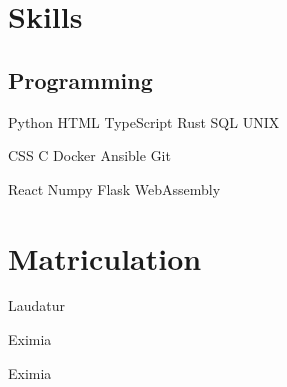 \documentclass[]{plushcv}
\begin{document}
\hfill
\begin{minipage}[t]{0.25\textwidth} 


\section{Skills}
\subsection{Programming}
\sectionsep

Python \textbullet{} HTML \textbullet{} TypeScript \textbullet{} Rust \textbullet{} SQL \textbullet{} UNIX \\
\sectionsep

CSS \textbullet{} C \textbullet{} Docker \textbullet{} Ansible  \textbullet{} Git \\
\sectionsep

React \textbullet{} Numpy \textbullet{} Flask \textbullet{} WebAssembly

\sectionsep
\sectionsep


\section{Matriculation} 

Laudatur \\
\sectionsep

Eximia \\
\sectionsep

Eximia \\
\sectionsep

\sectionsep



\end{minipage}
\end{document}
